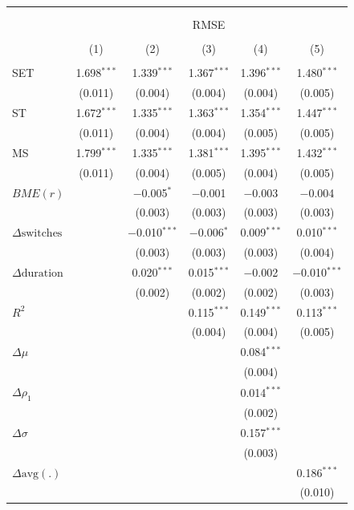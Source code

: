 \begin{tabular}{@{\extracolsep{5pt}}lccccc} 
\\[-1.8ex]\hline 
\hline \\[-1.8ex] 
\\[-1.8ex] & \multicolumn{5}{c}{RMSE} \\ 
\\[-1.8ex] & (1) & (2) & (3) & (4) & (5)\\ 
\hline \\[-1.8ex] 
 SET & 1.698$^{***}$ & 1.339$^{***}$ & 1.367$^{***}$ & 1.396$^{***}$ & 1.480$^{***}$ \\ 
  & (0.011) & (0.004) & (0.004) & (0.004) & (0.005) \\ 
  ST & 1.672$^{***}$ & 1.335$^{***}$ & 1.363$^{***}$ & 1.354$^{***}$ & 1.447$^{***}$ \\ 
  & (0.011) & (0.004) & (0.004) & (0.005) & (0.005) \\ 
  MS & 1.799$^{***}$ & 1.335$^{***}$ & 1.381$^{***}$ & 1.395$^{***}$ & 1.432$^{***}$ \\ 
  & (0.011) & (0.004) & (0.005) & (0.004) & (0.005) \\ 
  $BME(r)$ &  & $-$0.005$^{*}$ & $-$0.001 & $-$0.003 & $-$0.004 \\ 
  &  & (0.003) & (0.003) & (0.003) & (0.003) \\ 
  $\Delta \text{switches}$ &  & $-$0.010$^{***}$ & $-$0.006$^{*}$ & 0.009$^{***}$ & 0.010$^{***}$ \\ 
  &  & (0.003) & (0.003) & (0.003) & (0.004) \\ 
  $\Delta \text{duration}$ &  & 0.020$^{***}$ & 0.015$^{***}$ & $-$0.002 & $-$0.010$^{***}$ \\ 
  &  & (0.002) & (0.002) & (0.002) & (0.003) \\ 
  $R^2$ &  &  & 0.115$^{***}$ & 0.149$^{***}$ & 0.113$^{***}$ \\ 
  &  &  & (0.004) & (0.004) & (0.005) \\ 
  $\Delta \mu$ &  &  &  & 0.084$^{***}$ &  \\ 
  &  &  &  & (0.004) &  \\ 
  $\Delta \rho_1$ &  &  &  & 0.014$^{***}$ &  \\ 
  &  &  &  & (0.002) &  \\ 
  $\Delta \sigma$ &  &  &  & 0.157$^{***}$ &  \\ 
  &  &  &  & (0.003) &  \\ 
  $\Delta \text{avg}(.)$ &  &  &  &  & 0.186$^{***}$ \\ 
  &  &  &  &  & (0.010) \\ 

\end{tabular}
